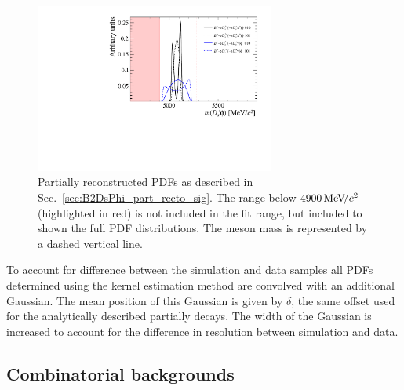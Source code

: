 

\begin{figure}[!h]
    \centering
    \includegraphics[width=0.70\textwidth]{figs/B2DsPhi/DsPhi_part_reco_Shapes.pdf}
    \caption{Partially reconstructed \decay{\Bp}{\Dssp\phiz} PDFs as described in Sec.~\ref{sec:B2DsPhi_part_recto_sig}. The range below $4900{\mathrm{\,Me\kern -0.1em V\!/}c^2}$ (highlighted in red) is not included in the fit range, but included to shown the full PDF distributions. The \Bp meson mass is represented by a dashed vertical line.}
    \label{fig:B2DsPhi_DsPhi_partreco}   
\end{figure}





To account for difference between the simulation and data samples all PDFs determined using the kernel estimation method are convolved with an additional Gaussian. The mean position of this Gaussian is given by $\delta$, the same offset used for the analytically described partially decays. The width of the Gaussian is increased to account for the difference in resolution between simulation and data. 


\subsection{Combinatorial  backgrounds}
\label{sec:B2DsPhi_combcomps}

